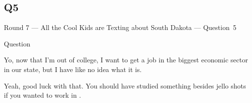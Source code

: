 \documentclass[11pt]{beamer}
\begin{document}
\subsection*{Q5}
\begin{frame}[t]{Round 7 --- All the Cool Kids are Texting about South Dakota --- \mbox{Question 5}}
\begin{block}{Question}

\begin{minipage}{0.9\textwidth}
\begin{mdframed}[
    roundcorner=7pt,
    backgroundcolor=black!5,
    linecolor=black!5,
    fontcolor=black,
    ignorelastdescenders]
\begin{flushleft}
{\small{}\selectfont{}
Yo, now that I'm out of college, I want to get a job in the biggest economic sector in our state, but I have like no idea what it is.
}
\end{flushleft}
\end{mdframed}
\end{minipage}

\hfill{}\begin{minipage}{0.9\textwidth}
\begin{mdframed}[
    roundcorner=7pt,
    backgroundcolor=blue!80!white,
    linecolor=blue!80!white,
    fontcolor=white,
    ignorelastdescenders]
\begin{flushleft}
{\small{}\selectfont{}
Yeah, good luck with that.  You should have studied something besides jello shots if you wanted to work in \textunderscore{}\textunderscore{}\textunderscore{}\textunderscore{}\textunderscore{}\textunderscore{}.
}
\end{flushleft}
\end{mdframed}
\end{minipage}
\end{block}
\end{frame}
\end{document}
